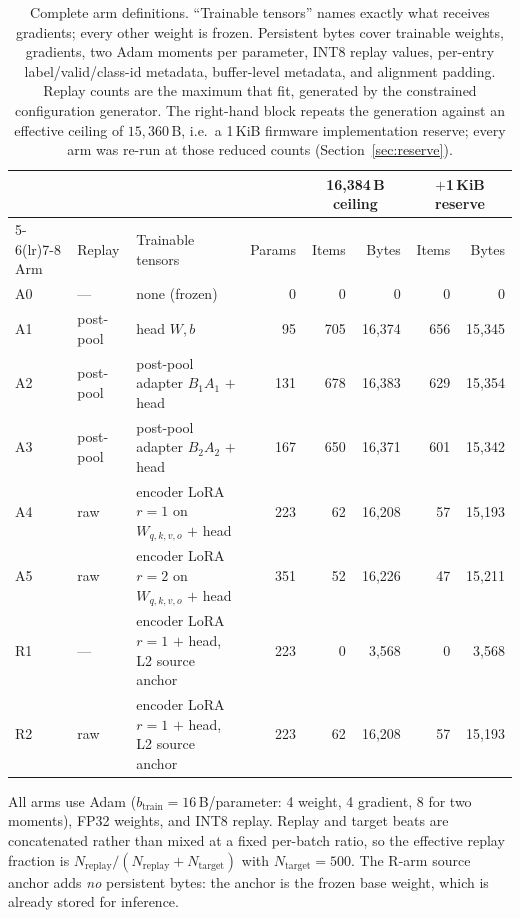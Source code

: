 \begin{table}[H]
\centering
\small
\caption{Complete arm definitions. ``Trainable tensors'' names exactly what
receives gradients; every other weight is frozen. Persistent bytes cover
trainable weights, gradients, two Adam moments per parameter, INT8 replay values,
per-entry label/valid/class-id metadata, buffer-level metadata, and alignment
padding. Replay counts are the maximum that fit, generated by the constrained
configuration generator. The right-hand block repeats the generation against an
effective ceiling of $15{,}360$\,B, i.e.\ a 1\,KiB firmware implementation
reserve; every arm was re-run at those reduced counts
(Section~\ref{sec:reserve}).}
\label{tab:arm_definitions}
\setlength{\tabcolsep}{4pt}
\begin{tabular}{llp{3.5cm}rrrrr}
\toprule
& & & & \multicolumn{2}{c}{16{,}384\,B ceiling} & \multicolumn{2}{c}{$+$1\,KiB reserve} \\
\cmidrule(lr){5-6}\cmidrule(lr){7-8}
Arm & Replay & Trainable tensors & Params & Items & Bytes & Items & Bytes \\
\midrule
A0 & ---       & none (frozen)                                   & 0   & 0   & 0        & 0   & 0 \\
A1 & post-pool & head $W,b$                                      & 95  & 705 & 16{,}374 & 656 & 15{,}345 \\
A2 & post-pool & post-pool adapter $B_1A_1$ $+$ head             & 131 & 678 & 16{,}383 & 629 & 15{,}354 \\
A3 & post-pool & post-pool adapter $B_2A_2$ $+$ head             & 167 & 650 & 16{,}371 & 601 & 15{,}342 \\
A4 & raw       & encoder LoRA $r{=}1$ on $W_{q,k,v,o}$ $+$ head  & 223 & 62  & 16{,}208 & 57  & 15{,}193 \\
A5 & raw       & encoder LoRA $r{=}2$ on $W_{q,k,v,o}$ $+$ head  & 351 & 52  & 16{,}226 & 47  & 15{,}211 \\
\midrule
R1 & ---       & encoder LoRA $r{=}1$ $+$ head, L2 source anchor & 223 & 0   & 3{,}568  & 0   & 3{,}568 \\
R2 & raw       & encoder LoRA $r{=}1$ $+$ head, L2 source anchor & 223 & 62  & 16{,}208 & 57  & 15{,}193 \\
\bottomrule
\end{tabular}

\vspace{0.4em}
{\small All arms use Adam ($b_{\mathrm{train}} = 16$\,B/parameter: 4 weight,
4 gradient, 8 for two moments), FP32 weights, and INT8 replay. Replay and target
beats are concatenated rather than mixed at a fixed per-batch ratio, so the
effective replay fraction is $N_{\mathrm{replay}}/(N_{\mathrm{replay}} +
N_{\mathrm{target}})$ with $N_{\mathrm{target}} = 500$. The R-arm source anchor
adds \emph{no} persistent bytes: the anchor is the frozen base weight, which is
already stored for inference.}
\end{table}
